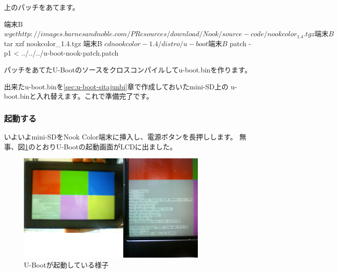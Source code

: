\documentclass[mingoth,a4paper]{jsarticle}
\begin{document}
上のパッチをあてます。

\begin{commandline}
端末B $ wget http://images.barnesandnoble.com/PResources/download/Nook/source-code/nookcolor_1.4.tgz
端末B $ tar xzf nookcolor_1.4.tgz
端末B $ cd nookcolor-1.4/distro/u-boot
端末B $ patch -p1 < ../../../u-boot-nook-patch.patch
\end{commandline}

パッチをあてたU-Bootのソースをクロスコンパイルしてu-boot.binを作ります\cite{orig-kernel-nook}。


出来たu-boot.binを\ref{sec:u-boot-sitajunbi}章で作成しておいたmini-SD上の
u-boot.binと入れ替えます。これで準備完了です。

\subsubsection{起動する}

いよいよmini-SDをNook Color端末に挿入し、電源ボタンを長押しします。
無事、図\ref{fig:u-boot-booting}のとおりU-Bootの起動画面がLCDに出ました。

\begin{figure}[ht]
  \begin{center}
    \includegraphics[width=1\hsize]{image2012-gum/u-boot-nook.png}
  \end{center}
  \caption{U-Bootが起動している様子}
  \label{fig:u-boot-booting}
\end{figure}
\end{document}
